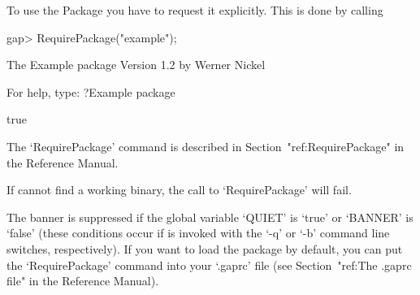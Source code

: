 To use the {\Example} Package you have to request it explicitly. This  is
done by calling

\beginexample
gap> RequirePackage("example");

           The Example package
               Version 1.2    
            by Werner Nickel 

     For help, type: ?Example package

true
\endexample

The `RequirePackage' command is described in Section~"ref:RequirePackage"
in the {\GAP} Reference Manual.

If {\GAP} cannot find a working binary, the call to `RequirePackage' will
fail.

The banner is suppressed if the global {\GAP} variable `QUIET' is  `true'
or `BANNER' is `false' (these conditions occur if {\GAP} is invoked  with
the `-q' or `-b' command line switches, respectively).  If  you  want  to
load the {\Example} package by default, you can put the  `RequirePackage'
command into your `.gaprc' file (see Section~"ref:The .gaprc file" in the
{\GAP} Reference Manual).

